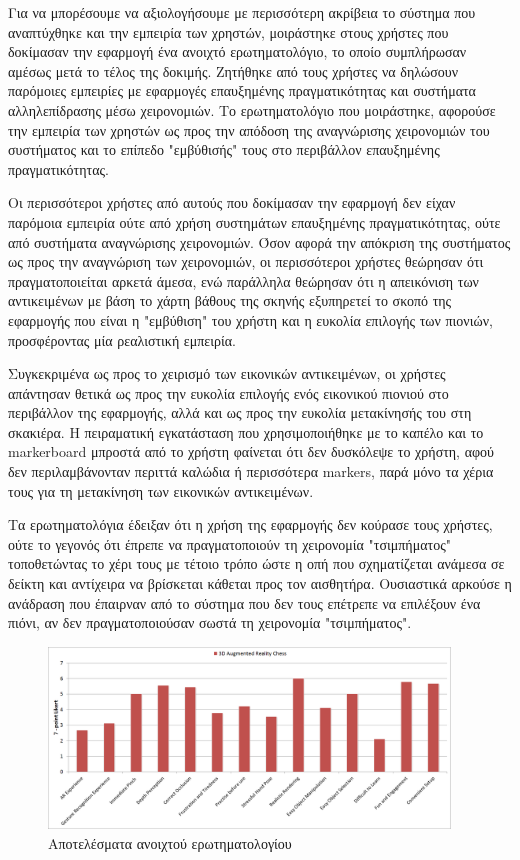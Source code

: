 Για να μπορέσουμε να αξιολογήσουμε με περισσότερη ακρίβεια το σύστημα που αναπτύχθηκε και την εμπειρία των χρηστών, μοιράστηκε στους χρήστες που δοκίμασαν την εφαρμογή ένα ανοιχτό ερωτηματολόγιο, το οποίο συμπλήρωσαν αμέσως μετά το τέλος της δοκιμής. Ζητήθηκε από τους χρήστες να δηλώσουν παρόμοιες εμπειρίες με εφαρμογές επαυξημένης πραγματικότητας και συστήματα αλληλεπίδρασης μέσω χειρονομιών. Το ερωτηματολόγιο που μοιράστηκε, αφορούσε την εμπειρία των χρηστών ως προς την απόδοση της αναγνώρισης χειρονομιών του συστήματος και το επίπεδο "εμβύθισής" τους στο περιβάλλον επαυξημένης πραγματικότητας. 


Οι περισσότεροι χρήστες από αυτούς που δοκίμασαν την εφαρμογή δεν είχαν παρόμοια εμπειρία ούτε από χρήση συστημάτων επαυξημένης πραγματικότητας, ούτε από συστήματα αναγνώρισης χειρονομιών.
Όσον αφορά την απόκριση της συστήματος ως προς την αναγνώριση των χειρονομιών, οι περισσότεροι χρήστες θεώρησαν ότι πραγματοποιείται αρκετά άμεσα, ενώ παράλληλα θεώρησαν ότι η απεικόνιση των αντικειμένων με βάση το χάρτη βάθους της σκηνής εξυπηρετεί το σκοπό της εφαρμογής που είναι η "εμβύθιση" του χρήστη και η ευκολία επιλογής των πιονιών, προσφέροντας μία ρεαλιστική εμπειρία.

Συγκεκριμένα ως προς το χειρισμό των εικονικών αντικειμένων, οι χρήστες απάντησαν θετικά ως προς την ευκολία επιλογής ενός εικονικού πιονιού στο περιβάλλον της εφαρμογής, αλλά και ως προς την ευκολία μετακίνησής του στη σκακιέρα. Η πειραματική εγκατάσταση που χρησιμοποιήθηκε με το καπέλο και το markerboard μπροστά από το χρήστη φαίνεται ότι δεν δυσκόλεψε το χρήστη, αφού δεν περιλαμβάνονταν περιττά καλώδια ή περισσότερα markers, παρά μόνο τα χέρια τους για τη μετακίνηση των εικονικών αντικειμένων.


Τα ερωτηματολόγια έδειξαν ότι η χρήση της εφαρμογής δεν κούρασε τους χρήστες, ούτε το γεγονός ότι έπρεπε να πραγματοποιούν τη χειρονομία "τσιμπήματος" τοποθετώντας το χέρι τους με τέτοιο τρόπο ώστε η οπή που σχηματίζεται ανάμεσα σε δείκτη και αντίχειρα να βρίσκεται κάθεται προς τον αισθητήρα. Ουσιαστικά αρκούσε η ανάδραση που έπαιρναν από το σύστημα που δεν τους επέτρεπε να επιλέξουν ένα πιόνι, αν δεν πραγματοποιούσαν σωστά τη χειρονομία "τσιμπήματος". 

\begin{figure}[H]
    \centering
    \includegraphics[width=0.95\textwidth]{Files/Figures/questionnaire.png}
     \caption[Αποτελέσματα ανοιχτού ερωτηματολογίου]{Αποτελέσματα ανοιχτού ερωτηματολογίου}
    \label{fig:open}
\end{figure}




